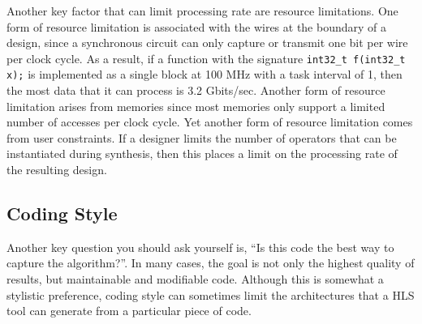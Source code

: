 
%


Another key factor that can limit processing rate are resource limitations.  One form of resource limitation is associated with the wires at the boundary of a design, since a synchronous circuit can only capture or transmit one bit per wire per clock cycle.  As a result, if a function with the signature \lstinline|int32_t f(int32_t x);| is implemented as a single block at 100 MHz with a task interval of 1, then the most data that it can process is 3.2 Gbits/sec. Another form of resource limitation arises from memories since most memories only support a limited number of accesses per clock cycle.  Yet another form of resource limitation comes from user constraints.  If a designer limits the number of operators that can be instantiated during synthesis, then this places a limit on the processing rate of the resulting design.

%

\subsection{Coding Style}

Another key question you should ask yourself is, ``Is this code the best way to capture the algorithm?''.  In many cases, the goal is not only the highest quality of results, but maintainable and modifiable code.  Although this is somewhat a stylistic preference, coding style can sometimes limit the architectures that a HLS tool can generate from a particular piece of code.


